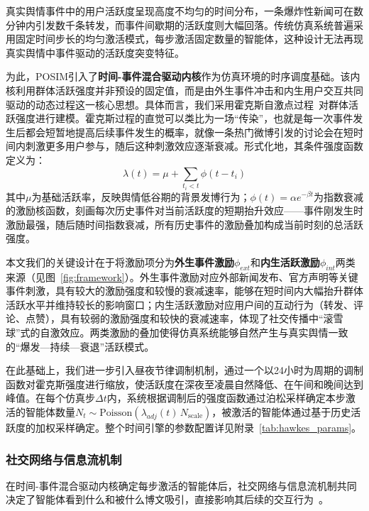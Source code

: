\documentclass[a4paper,fleqn]{cas-sc}
\begin{document}
真实舆情事件中的用户活跃度呈现高度不均匀的时间分布，一条爆炸性新闻可在数分钟内引发数千条转发，而事件间歇期的活跃度则大幅回落。传统仿真系统普遍采用固定时间步长的均匀激活模式，每步激活固定数量的智能体，这种设计无法再现真实舆情中事件驱动的活跃度突变特征。

为此，POSIM引入了\textbf{时间-事件混合驱动内核}作为仿真环境的时序调度基础。该内核利用群体活跃强度并非预设的固定值，而是由外生事件冲击和内生用户交互共同驱动的动态过程这一核心思想。具体而言，我们采用霍克斯自激点过程~\citep{hawkes_spectra_1971}对群体活跃强度进行建模。霍克斯过程的直觉可以类比为一场“传染”，也就是每一次事件发生后都会短暂地提高后续事件发生的概率，就像一条热门微博引发的讨论会在短时间内刺激更多用户参与，随后这种刺激效应逐渐衰减。形式化地，其条件强度函数定义为：
\begin{equation}
\lambda(t) = \mu + \sum_{t_i < t} \phi(t - t_i)
\label{eq:hawkes}
\end{equation}
其中$\mu$为基础活跃率，反映舆情低谷期的背景发博行为；$\phi(t) = \alpha e^{-\beta t}$为指数衰减的激励核函数，刻画每次历史事件对当前活跃度的短期抬升效应——事件刚发生时激励最强，随后随时间指数衰减，所有历史事件的激励叠加构成当前时刻的总活跃强度。

本文我们的关键设计在于将激励项分为\textbf{外生事件激励}$\phi_{ext}$和\textbf{内生活跃激励}$\phi_{int}$两类来源（见图~\ref{fig:framework}）。外生事件激励对应外部新闻发布、官方声明等关键事件刺激，具有较大的激励强度和较慢的衰减速率，能够在短时间内大幅抬升群体活跃水平并维持较长的影响窗口；内生活跃激励对应用户间的互动行为（转发、评论、点赞），具有较弱的激励强度和较快的衰减速率，体现了社交传播中“滚雪球”式的自激效应。两类激励的叠加使得仿真系统能够自然产生与真实舆情一致的“爆发—持续—衰退”活跃模式。

在此基础上，我们进一步引入昼夜节律调制机制，通过一个以24小时为周期的调制函数对霍克斯强度进行缩放，使活跃度在深夜至凌晨自然降低、在午间和晚间达到峰值。在每个仿真步$\Delta t$内，系统根据调制后的强度函数通过泊松采样确定本步激活的智能体数量$N_t \sim \text{Poisson}(\lambda_{adj}(t)\, N_{\text{scale}})$，被激活的智能体通过基于历史活跃度的加权采样确定。整个时间引擎的参数配置详见附录~\ref{tab:hawkes_params}。

\subsubsection{社交网络与信息流机制}

在时间-事件混合驱动内核确定每步激活的智能体后，社交网络与信息流机制共同决定了智能体看到什么和被什么博文吸引，直接影响其后续的交互行为~\citep{wu2023algorithmic_exposure}。
\end{document}
